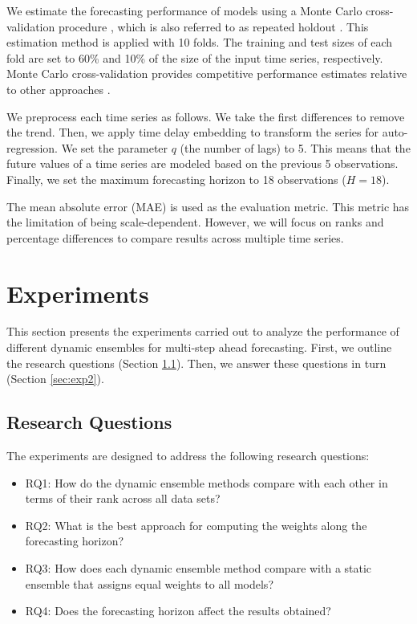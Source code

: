 \documentclass[smallcondensed]{svjour3}
\begin{document}
We estimate the forecasting performance of models using a Monte Carlo cross-validation procedure \cite{picard1984cross}, which is also referred to as repeated holdout \cite{cerqueira2020evaluating}.
This estimation method is applied with 10 folds. The training and test sizes of each fold are set to 60\% and 10\% of the size of the input time series, respectively. 
Monte Carlo cross-validation provides competitive performance estimates relative to other approaches \cite{cerqueira2020evaluating}.

We preprocess each time series as follows. We take the first differences to remove the trend. Then, we apply time delay embedding to transform the series for auto-regression. We set the parameter $q$ (the number of lags) to 5. This means that the future values of a time series are modeled based on the previous 5 observations.
Finally, we set the maximum forecasting horizon to 18 observations ($H=18$). 

The mean absolute error (MAE) is used as the evaluation metric. This metric has the limitation of being scale-dependent. However, we will focus on ranks and percentage differences to compare results across multiple time series.


\section{Experiments}\label{sec:ee}

This section presents the experiments carried out to analyze the performance of different dynamic ensembles for multi-step ahead forecasting. First, we outline the research questions (Section \ref{sec:exp1}). Then, we answer these questions in turn (Section \ref{sec:exp2}).

\subsection{Research Questions}\label{sec:exp1}

The experiments are designed to address the following research questions:

\begin{itemize}
    \item RQ1: How do the dynamic ensemble methods compare with each other in terms of their rank across all data sets?
    
    \item RQ2: What is the best approach for computing the weights along the forecasting horizon?
    
    \item RQ3: How does each dynamic ensemble method compare with a static ensemble that assigns equal weights to all models?
    
    \item RQ4: Does the forecasting horizon affect the results obtained?
\end{itemize}
\end{document}
